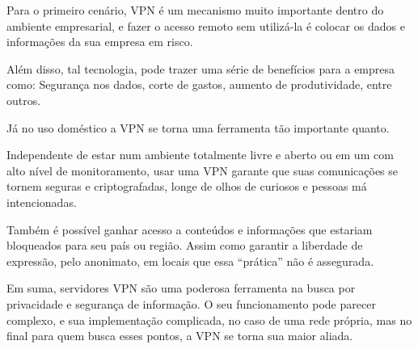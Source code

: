 \documentclass[12pt]{article}
\begin{document}
\begin{flushleft}
Para o primeiro cenário, VPN é um mecanismo muito importante dentro do ambiente empresarial, e fazer o acesso remoto sem utilizá-la é colocar os dados e informações da sua empresa em risco.

Além disso, tal tecnologia, pode trazer uma série de benefícios para a empresa como: Segurança nos dados, corte de gastos, aumento de produtividade, entre outros.

Já no uso doméstico a VPN se torna uma ferramenta tão importante quanto. 

Independente de estar num ambiente totalmente livre e aberto ou em um com alto nível de monitoramento, usar uma VPN garante que suas comunicações se tornem seguras e criptografadas, longe de olhos de curiosos e pessoas má intencionadas.

Também é possível ganhar acesso a conteúdos e informações que estariam bloqueados para seu país ou região. Assim como garantir a liberdade de expressão, pelo anonimato, em locais que essa “prática” não é assegurada. 

Em suma, servidores VPN são uma poderosa ferramenta na busca por privacidade e segurança de informação. O seu funcionamento pode parecer complexo, e sua implementação complicada, no caso de uma rede própria, mas no final para quem busca esses pontos, a VPN se torna sua maior aliada.






\cite{hostone:100}
\cite{stackexchange:101}
\cite{compugraf:103}
\cite{starti:104}

\end{flushleft}
\end{document}
